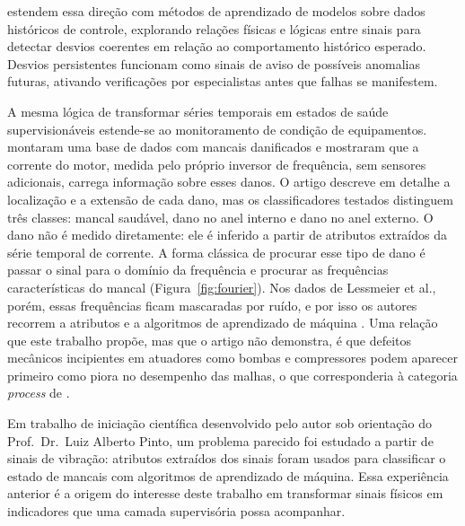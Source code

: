  estendem essa direção com métodos de aprendizado de modelos sobre dados históricos de controle, explorando relações físicas e lógicas entre sinais para detectar desvios coerentes em relação ao comportamento histórico esperado. Desvios persistentes funcionam como sinais de aviso de possíveis anomalias futuras, ativando verificações por especialistas antes que falhas se manifestem.

A mesma lógica de transformar séries temporais em estados de saúde supervisionáveis estende-se ao monitoramento de condição de equipamentos.  montaram uma base de dados com mancais danificados e mostraram que a corrente do motor, medida pelo próprio inversor de frequência, sem sensores adicionais, carrega informação sobre esses danos. O artigo descreve em detalhe a localização e a extensão de cada dano, mas os classificadores testados distinguem três classes: mancal saudável, dano no anel interno e dano no anel externo. O dano não é medido diretamente: ele é inferido a partir de atributos extraídos da série temporal de corrente. A forma clássica de procurar esse tipo de dano é passar o sinal para o domínio da frequência e procurar as frequências características do mancal (Figura~\ref{fig:fourier}). Nos dados de Lessmeier et al., porém, essas frequências ficam mascaradas por ruído, e por isso os autores recorrem a atributos e a algoritmos de aprendizado de máquina \cite{Lessmeier2016}. Uma relação que este trabalho propõe, mas que o artigo não demonstra, é que defeitos mecânicos incipientes em atuadores como bombas e compressores podem aparecer primeiro como piora no desempenho das malhas, o que corresponderia à categoria \textit{process} de .

Em trabalho de iniciação científica desenvolvido pelo autor sob orientação do Prof.\ Dr.\ Luiz Alberto Pinto, um problema parecido foi estudado a partir de sinais de vibração: atributos extraídos dos sinais foram usados para classificar o estado de mancais com algoritmos de aprendizado de máquina. Essa experiência anterior é a origem do interesse deste trabalho em transformar sinais físicos em indicadores que uma camada supervisória possa acompanhar.

